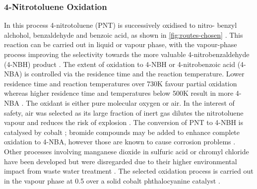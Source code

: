 \subsubsection{4-Nitrotoluene Oxidation}
\label{4-NTox}
In this process 4-nitrotoluene (PNT) is successively oxidised to nitro- benzyl alchohol, benzaldehyde and benzoic acid, as shown in \cref{fig:routes-chosen} \cite{hoorn_modelling_2005}. This reaction can be carried out in liquid or vapour phase, with the vapour-phase process improving the selectivity towards the more valuable 4-nitrobenzaldehyde (4-NBH) product \cite{bruhne_benzaldehyde_2011}. 
The extent of oxidation to 4-NBH or 4-nitrobenzoic acid (4-NBA) is controlled via the residence time and the reaction temperature. Lower residence time and reaction temperatures over 730K favour partial oxidation whereas higher residence time and temperatures below 500K result in more 4-NBA \cite{bruhne_benzaldehyde_2011,tan_kinetic_2010}.
The oxidant is either pure molecular oxygen or air. In the interest of safety, air was selected as its large fraction of inert  gas dilutes the nitrotoluene vapour and reduces the risk of explosion \cite{bruhne_benzaldehyde_2011}. 
The conversion of PNT to 4-NBH is catalysed by cobalt \cite{wendt_reaction_1986}; bromide compounds may be added to enhance complete oxidation to 4-NBA, however those are known to cause corrosion problems \cite{opgrande_benzoic_2003}.
Other processes involving manganese dioxide in sulfuric acid or chromyl chloride have been developed but were disregarded due to their higher environmental impact from waste water treatment \cite{bruhne_benzaldehyde_2011}.
The selected oxidation process is carried out in the vapour phase at \SI{0.5}{\atm} over a solid cobalt phthalocyanine catalyst \cite{chandalia_kinetics_1999}. %



 

